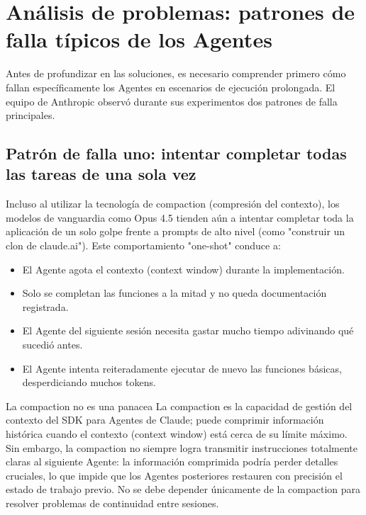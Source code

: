 \section{Análisis de problemas: patrones de falla típicos de los Agentes}

Antes de profundizar en las soluciones, es necesario comprender primero cómo fallan específicamente los Agentes en escenarios de ejecución prolongada. El equipo de Anthropic observó durante sus experimentos dos patrones de falla principales.

\subsection{Patrón de falla uno: intentar completar todas las tareas de una sola vez}

Incluso al utilizar la tecnología de compaction (compresión del contexto), los modelos de vanguardia como Opus 4.5 tienden aún a intentar completar toda la aplicación de un solo golpe frente a prompts de alto nivel (como "construir un clon de claude.ai"). Este comportamiento "one-shot" conduce a:

\begin{itemize}
    \item El Agente agota el contexto (context window) durante la implementación.
    \item Solo se completan las funciones a la mitad y no queda documentación registrada.
    \item El Agente del siguiente sesión necesita gastar mucho tiempo adivinando qué sucedió antes.
    \item El Agente intenta reiteradamente ejecutar de nuevo las funciones básicas, desperdiciando muchos tokens.
\end{itemize}

\begin{warningbox}{La compaction no es una panacea}
La compaction es la capacidad de gestión del contexto del SDK para Agentes de Claude; puede comprimir información histórica cuando el contexto (context window) está cerca de su límite máximo. Sin embargo, la compaction no siempre logra transmitir instrucciones totalmente claras al siguiente Agente: la información comprimida podría perder detalles cruciales, lo que impide que los Agentes posteriores restauren con precisión el estado de trabajo previo. No se debe depender únicamente de la compaction para resolver problemas de continuidad entre sesiones.
\end{warningbox}

